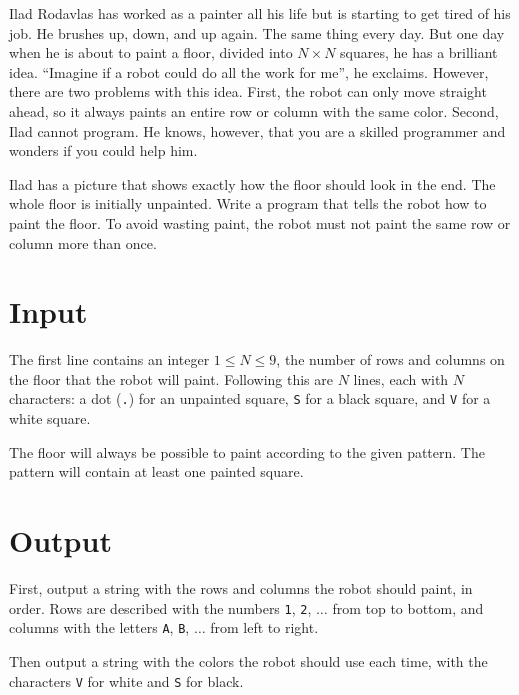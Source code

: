 \noindent
Ilad Rodavlas has worked as a painter all his life but is starting to get tired of his job.
He brushes up, down, and up again.
The same thing every day.
But one day when he is about to paint a floor, divided into $N \times N$ squares, he has a brilliant idea.
``Imagine if a robot could do all the work for me'', he exclaims.
However, there are two problems with this idea.
First, the robot can only move straight ahead, so it always paints an entire row or column with the same color.
Second, Ilad cannot program.
He knows, however, that you are a skilled programmer and wonders if you could help him.

Ilad has a picture that shows exactly how the floor should look in the end.
The whole floor is initially unpainted.
Write a program that tells the robot how to paint the floor.
To avoid wasting paint, the robot must not paint the same row or column more than once.


\section*{Input}
The first line contains an integer $1 \leq N \leq 9$, the number of rows and columns on the floor that the robot will paint.
Following this are $N$ lines, each with $N$ characters: a dot (\verb|.|) for an unpainted square, \verb|S| for a black square, and \verb|V| for a white square.

The floor will always be possible to paint according to the given pattern. The pattern will contain at least one painted square.

\section*{Output}
First, output a string with the rows and columns the robot should paint, in order.
Rows are described with the numbers \verb|1|, \verb|2|, $\dots$ from top to bottom, and columns with the letters \verb|A|, \verb|B|, $\dots$ from left to right.

Then output a string with the colors the robot should use each time, with the characters \texttt{V} for white and \texttt{S} for black.

